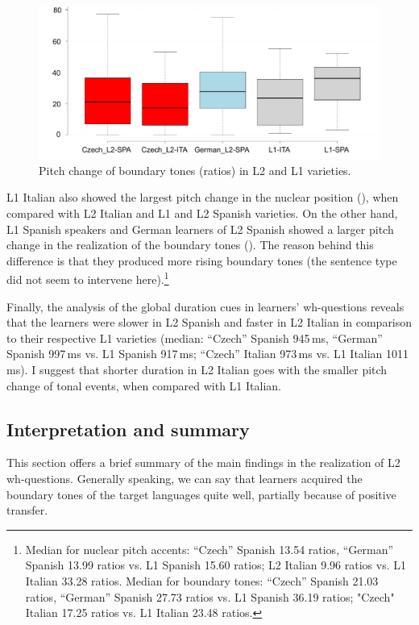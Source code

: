 \begin{figure}[p]
\includegraphics[width=\textwidth]{figures/Figure_134.pdf}
\caption{Pitch change of boundary tones (ratios) in L2 and L1 varieties.}
\label{fig:4.134}
\end{figure}

L1 Italian also showed the largest pitch change in the nuclear position (), when compared with L2 Italian and L1 and L2 Spanish varieties. On the other hand, L1 Spanish speakers and German learners of L2 Spanish showed a larger pitch change in the realization of the boundary tones (). The reason behind this difference is that they produced more rising boundary tones (the sentence type did not seem to intervene here).\footnote{Median for nuclear pitch accents: “Czech” Spanish 13.54 ratios, “German” Spanish 13.99 ratios vs. L1 Spanish 15.60 ratios; L2 Italian 9.96 ratios vs. L1 Italian 33.28 ratios. Median for boundary tones: “Czech” Spanish 21.03 ratios, “German” Spanish 27.73 ratios vs. L1 Spanish 36.19 ratios; "Czech" Italian 17.25 ratios vs. L1 Italian 23.48 ratios.}

Finally, the analysis of the global duration cues in learners’ wh-questions reveals that the learners were slower in L2 Spanish and faster in L2 Italian in comparison to their respective L1 varieties (median: “Czech” Spanish 945\,ms, “German” Spanish 997\,ms vs. L1 Spanish 917\,ms; “Czech” Italian 973\,ms vs. L1 Italian 1011\,ms). I suggest that shorter duration in L2 Italian goes with the smaller pitch change of tonal events, when compared with L1 Italian.

\subsection{Interpretation and summary}\label{sec:4.4.5}

This section offers a brief summary of the main findings in the realization of L2 wh-questions. Generally speaking, we can say that learners acquired the boundary tones of the target languages quite well, partially because of positive transfer.


